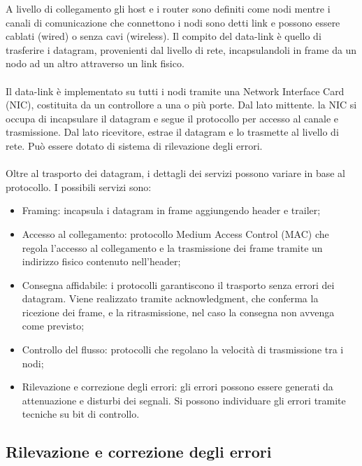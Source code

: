 \documentclass{subfiles}
\begin{document}
    A livello di collegamento gli host e i router sono definiti come nodi mentre i canali di comunicazione che connettono i nodi sono 
    detti link e possono essere cablati (wired) o senza cavi (wireless). Il compito del data-link è quello di trasferire i datagram, 
    provenienti dal livello di rete, incapsulandoli in frame da un nodo ad un altro attraverso un link fisico.\\ \\
    Il data-link è implementato su tutti i nodi tramite una Network Interface Card (NIC), costituita da un controllore a una o più porte.
    Dal lato mittente. la NIC si occupa di incapsulare il datagram e segue il protocollo per accesso al canale e trasmissione. Dal lato 
    ricevitore, estrae il datagram e lo trasmette al livello di rete. Può essere dotato di sistema di rilevazione degli errori.\\ \\
    Oltre al trasporto dei datagram, i dettagli dei servizi possono variare in base al protocollo. I possibili servizi sono:
    \begin{itemize}
        \item Framing: incapsula i datagram in frame aggiungendo header e trailer;
        \item Accesso al collegamento: protocollo Medium Access Control (MAC) che regola l'accesso al collegamento e la trasmissione 
        dei frame tramite un indirizzo fisico contenuto nell'header;
        \item Consegna affidabile: i protocolli garantiscono il trasporto senza errori dei datagram. Viene realizzato tramite 
        acknowledgment, che conferma la ricezione dei frame, e la ritrasmissione, nel caso la consegna non avvenga come previsto;
        \item Controllo del flusso: protocolli che regolano la velocità di trasmissione tra i nodi;
        \item Rilevazione e correzione degli errori: gli errori possono essere generati da attenuazione e disturbi dei segnali. Si 
        possono individuare gli errori tramite tecniche su bit di controllo.
    \end{itemize}

    \subsection{Rilevazione e correzione degli errori}
    
    \clearpage

    
\end{document}
